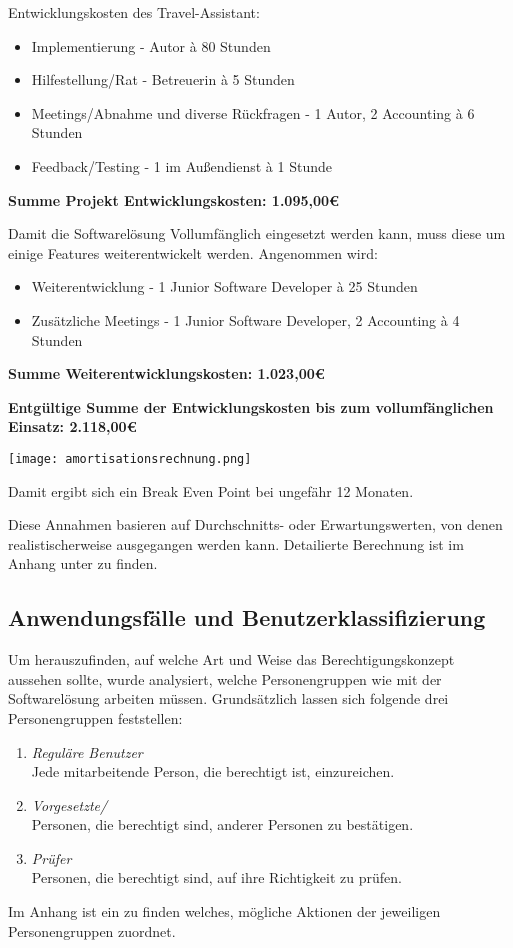 Entwicklungskosten des Travel-Assistant:
\begin{itemize}

\item Implementierung - Autor à 80 Stunden
\item Hilfestellung/Rat - Betreuerin à 5 Stunden 
\item Meetings/Abnahme und diverse Rückfragen - 1 Autor, 2  Accounting à 6 Stunden
\item Feedback/Testing - 1  im Außendienst à 1 Stunde
\end{itemize}

\textbf{Summe Projekt Entwicklungskosten: 1.095,00€}

Damit die Softwarelösung Vollumfänglich eingesetzt werden kann, muss diese um einige Features weiterentwickelt werden. Angenommen wird:
\begin{itemize}
\item Weiterentwicklung - 1 Junior Software Developer à 25 Stunden
\item Zusätzliche Meetings - 1 Junior Software Developer, 2  Accounting à 4 Stunden
\end{itemize}

\textbf{Summe Weiterentwicklungskosten: 1.023,00€}

\textbf{Entgültige Summe der Entwicklungskosten bis zum vollumfänglichen Einsatz: 2.118,00€}

\texttt{[image: amortisationsrechnung.png]}

Damit ergibt sich ein Break Even Point bei ungefähr 12 Monaten.

Diese Annahmen basieren auf Durchschnitts- oder Erwartungswerten, von denen realistischerweise ausgegangen werden kann.
Detailierte Berechnung ist im Anhang unter  zu finden.

\subsection{Anwendungsfälle und Benutzerklassifizierung}
\label{sec:Analysephase:Benutzerklassifizierung}

Um herauszufinden, auf welche Art und Weise das Berechtigungskonzept aussehen sollte, wurde analysiert, welche Personengruppen wie mit der Softwarelösung arbeiten müssen.
Grundsätzlich lassen sich folgende drei Personengruppen feststellen:

\begin{enumerate}
    \item \emph{Reguläre Benutzer}\\
    Jede mitarbeitende Person, die berechtigt ist,  einzureichen.
    \item \emph{Vorgesetzte/}\\
    Personen, die berechtigt sind,  anderer Personen zu bestätigen.
    \item \emph{Prüfer}\\
    Personen, die berechtigt sind,  auf ihre Richtigkeit zu prüfen.
\end{enumerate}

Im Anhang ist ein  zu finden welches, mögliche Aktionen der jeweiligen Personengruppen zuordnet.